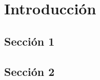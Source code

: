 \chapter{Introducción}
\lipsum[1-2]

\section{Sección 1}
\lipsum[3-6]

\section{Sección 2}
\lipsum[7-11]
